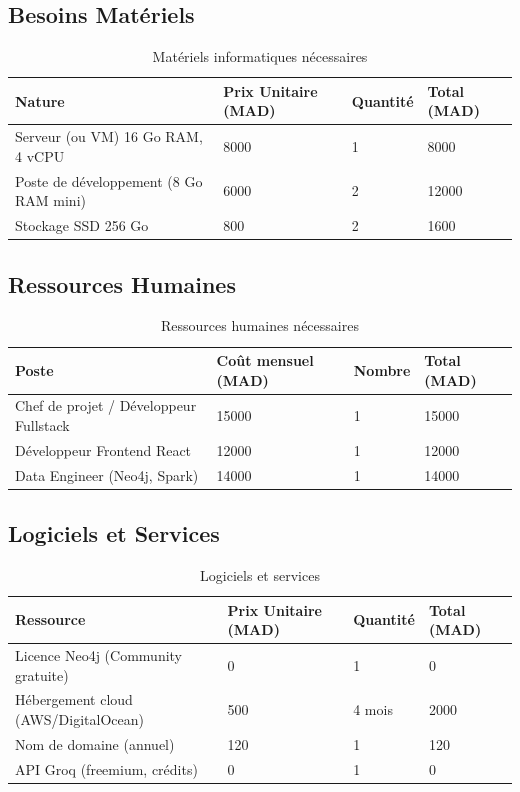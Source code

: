 \documentclass[12pt,a4paper]{report}
\begin{document}
\subsection{Besoins Matériels}
\begin{table}[H]
\centering
\caption{Matériels informatiques nécessaires}
\label{tab:tech_hardware}
\begin{tabular}{p{4cm} p{3cm} p{3cm} p{3cm}}
\toprule
\textbf{Nature} & \textbf{Prix Unitaire (MAD)} & \textbf{Quantité} & \textbf{Total (MAD)} \\
\midrule
Serveur (ou VM) 16 Go RAM, 4 vCPU & 8000 & 1 & 8000 \\
Poste de développement (8 Go RAM mini) & 6000 & 2 & 12000 \\
Stockage SSD 256 Go & 800 & 2 & 1600 \\
\bottomrule
\end{tabular}
\end{table}

\subsection{Ressources Humaines}
\begin{table}[H]
\centering
\caption{Ressources humaines nécessaires}
\label{tab:tech_humaines}
\begin{tabular}{p{5cm} p{3cm} p{3cm} p{3cm}}
\toprule
\textbf{Poste} & \textbf{Coût mensuel (MAD)} & \textbf{Nombre} & \textbf{Total (MAD)} \\
\midrule
Chef de projet / Développeur Fullstack & 15000 & 1 & 15000 \\
Développeur Frontend React & 12000 & 1 & 12000 \\
Data Engineer (Neo4j, Spark) & 14000 & 1 & 14000 \\
\bottomrule
\end{tabular}
\end{table}

\subsection{Logiciels et Services}
\begin{table}[H]
\centering
\caption{Logiciels et services}
\label{tab:tech_logiciels}
\begin{tabular}{p{5cm} p{3cm} p{3cm} p{3cm}}
\toprule
\textbf{Ressource} & \textbf{Prix Unitaire (MAD)} & \textbf{Quantité} & \textbf{Total (MAD)} \\
\midrule
Licence Neo4j (Community gratuite) & 0 & 1 & 0 \\
Hébergement cloud (AWS/DigitalOcean) & 500 & 4 mois & 2000 \\
Nom de domaine (annuel) & 120 & 1 & 120 \\
API Groq (freemium, crédits) & 0 & 1 & 0 \\
\bottomrule
\end{tabular}
\end{table}
\end{document}
